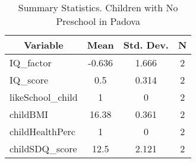 
\begin{table}[htbp]\centering \caption{Summary Statistics. Children with No Preschool in Padova \label{bothChildmaternaNonePadova}}
\begin{tabular}{l c c  c}\hline\hline
\multicolumn{1}{c}{\textbf{Variable}} & \textbf{Mean}
 & \textbf{Std. Dev.} & \textbf{N}\\ \hline
IQ\_factor & -0.636 & 1.666  & 2\\
IQ\_score & 0.5 & 0.314  & 2\\
likeSchool\_child & 1 & 0  & 2\\
childBMI & 16.38 & 0.361  & 2\\
childHealthPerc & 1 & 0  & 2\\
childSDQ\_score & 12.5 & 2.121  & 2\\
\hline\end{tabular}
\end{table}
